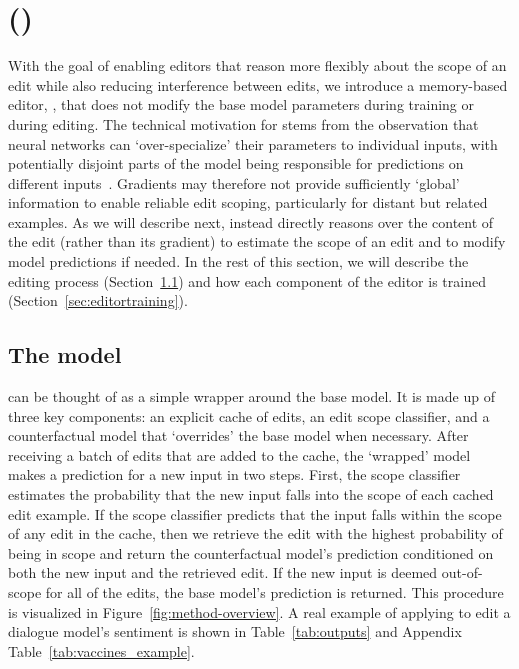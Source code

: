 \documentclass{article}
\begin{document}
\section{{\fullnamevar} ({\name})}
\label{sec:method}

With the goal of enabling editors that reason more flexibly about the scope of an edit while also reducing interference between edits, we introduce a memory-based editor, {\name}, that does not modify the base model parameters during training or during editing. The technical motivation for {\name} stems from the observation that neural networks can `over-specialize' their parameters to individual inputs, with potentially disjoint parts of the model being responsible for predictions on different inputs~\citep{csordas2021are}. Gradients may therefore not provide sufficiently `global' information to enable reliable edit scoping, particularly for distant but related examples. As we will describe next, {\name} instead directly reasons over the content of the edit (rather than its gradient) to estimate the scope of an edit and to modify model predictions if needed. In the rest of this section, we will describe the editing process (Section~\ref{sec:editor}) and how each component of the editor is trained (Section~\ref{sec:editortraining}).

\subsection{The {\name} model}
\label{sec:editor}

{\name} can be thought of as a simple wrapper around the base model. It is made up of three key components: an explicit cache of edits, an edit scope classifier, and a counterfactual model that `overrides' the base model when necessary. After receiving a batch of edits that are added to the cache, the `wrapped' model makes a prediction for a new input in two steps. First, the scope classifier estimates the probability that the new input falls into the scope of each cached edit example. If the scope classifier predicts that the input falls within the scope of any edit in the cache, then we retrieve the edit with the highest probability of being in scope and return the counterfactual model's prediction conditioned on both the new input and the retrieved edit. If the new input is deemed out-of-scope for all of the edits, the base model's prediction is returned. This procedure is visualized in Figure~\ref{fig:method-overview}. A real example of applying {\name} to edit a dialogue model's sentiment is shown in Table~\ref{tab:outputs} and Appendix Table~\ref{tab:vaccines_example}.
\end{document}

